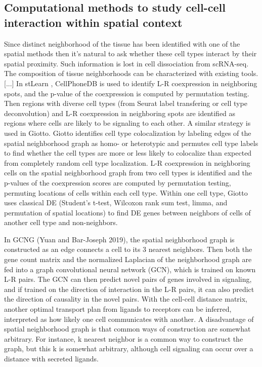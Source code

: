 \subsubsection{}
\subsubsection{}
\subsection{Computational methods to study cell-cell interaction within spatial context}
Since distinct neighborhood of the tissue has been identified with one of the spatial methods then it’s natural to ask whether these cell types interact by their spatial proximity. Such information is lost in cell dissociation from scRNA-seq. The composition of tissue neighborhoods can be characterized with existing tools.
[...]
In stLearn , CellPhoneDB is used to identify L-R coexpression in neighboring spots, and the p-value of the coexpression is computed by permutation testing. Then regions with diverse cell types (from Seurat label transfering or cell type deconvolution) and L-R coexpression in neighboring spots are identified as regions where cells are likely to be signaling to each other. A similar strategy is used in Giotto. Giotto identifies cell type colocalization by labeling edges of the spatial neighborhood graph as homo- or heterotypic and permutes cell type labels to find whether the cell types are more or less likely to colocalize than expected from completely random cell type localization. L-R coexpression in neighboring cells on the spatial neighborhood graph from two cell types is identified and the p-values of the coexpression scores are computed by permutation testing, permuting locations of cells within each cell type. Within one cell type, Giotto uses classical DE (Student’s t-test, Wilcoxon rank sum test, limma, and permutation of spatial locations) to find DE genes between neighbors of cells of another cell type and non-neighbors.

In GCNG (Yuan and Bar-Joseph 2019), the spatial neighborhood graph is constructed as an edge connects a cell to its 3 nearest neighbors. Then both the gene count matrix and the normalized Laplacian of the neighborhood graph are fed into a graph convolutional neural network (GCN), which is trained on known L-R pairs. The GCN can then predict novel pairs of genes involved in signaling, and if trained on the direction of interaction in the L-R pairs, it can also predict the direction of causality in the novel pairs. With the cell-cell distance matrix, another optimal transport plan from ligands to receptors can be inferred, interpreted as how likely one cell communicates with another. A disadvantage of spatial neighborhood graph is that common ways of construction are somewhat arbitrary. For instance, k nearest neighbor is a common way to construct the graph, but this k is somewhat arbitrary, although cell signaling can occur over a distance with secreted ligands.

